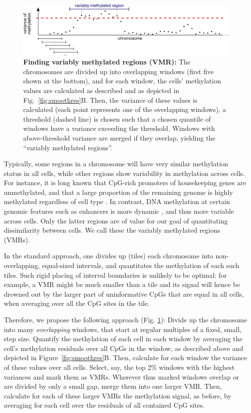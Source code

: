 \documentclass[twocolumn,10pt]{article}
\begin{document}
\begin{figure}
    \includegraphics[width=\columnwidth]{figures/Fig_sliding.png}
    \caption{\small \textbf{Finding variably methylated regions (VMR):} The chromosomes are divided up into overlapping windows (first five shown at the bottom), and for each window, the cells' methylation values are calculated as described and as depicted in Fig.\ \ref{fig:smoothres}B. Then, the variance of these values is calculated (each point represents one of the overlapping windows), a threshold (dashed line) is chosen such that a chosen quantile of windows have a variance exceeding the threshold. Windows with above-threshold variance are merged if they overlap, yielding the ``variably methylated regions''.}
    \label{vmr}
\end{figure}


Typically, some regions in a chromosome will have very similar methylation status in all cells, while other regions show variability in methylation across cells. For instance, it is long known that CpG-rich promoters of housekeeping genes are unmethylated, and that a large proportion of the remaining genome is highly methylated regardless of cell type \citep{bird1986cpg}. In contrast, DNA methylation at certain genomic features such as enhancers is more dynamic \citep{argelaguet2019gastru}, and thus more variable across cells.
Only the latter regions are of value for our goal of quantitating dissimilarity between cells. We call these the variably methylated regions (VMRs).

In the standard approach, one divides up (tiles) each chromosome into non-overlapping, equal-sized intervals, and quantitates the methylation of each such tiles. Such rigid placing of interval boundaries is unlikely to be optimal: for example, a VMR might be much smaller than a tile and its signal will hence be drowned out by the larger part of uninformative CpGs that are equal in all cells, when averaging over all the CpG sites in the tile.

Therefore, we propose the following approach (Fig. \ref{vmr}): Divide up the chromosome into many \emph{overlapping} windows, that start at regular multiples of a fixed, small, step size. Quantify the methylation of each cell in each window by averaging the cell's methylation residuals over all CpGs in the window, as described above and depicted in Figure\ \ref{fig:smoothres}B. Then, calculate for each window the variance of these values over all cells. Select, say, the top 2\% windows with the highest variances and mark them as VMRs. Wherever thus marked windows overlap or are divided by only a small gap, merge them into one larger VMR. Then, calculate for each of these larger VMRs the methylation signal, as before, by averaging for each cell over the residuals of all contained CpG sites.
\end{document}
